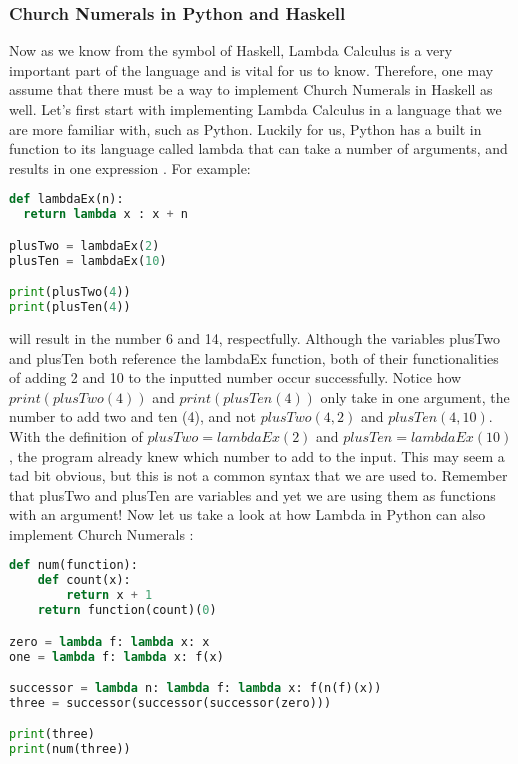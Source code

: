 \documentclass{article}
\begin{document}
\subsubsection{Church Numerals in Python and Haskell}
Now as we know from the symbol of Haskell, Lambda Calculus is a very important part of the language and is vital for us to know. Therefore, one may assume that there must be a way to implement Church Numerals in Haskell as well. Let's first start with implementing Lambda Calculus in a language that we are more familiar with, such as Python. Luckily for us, Python has a built in function to its language called lambda that can take a number of arguments, and results in one expression \cite{LCP}. For example:
\begin{lstlisting}[language=Python]
def lambdaEx(n):
  return lambda x : x + n

plusTwo = lambdaEx(2)
plusTen = lambdaEx(10)

print(plusTwo(4)) 
print(plusTen(4)) 
\end{lstlisting}

\noindent
will result in the number 6 and 14, respectfully. Although the variables plusTwo and plusTen both reference the lambdaEx function, both of their functionalities of adding 2 and 10 to the inputted number occur successfully. Notice how $print(plusTwo(4))$ and $print(plusTen(4))$ only take in one argument, the number to add two and ten (4), and not $plusTwo(4, 2)$ and $plusTen(4, 10)$. With the definition of $plusTwo = lambdaEx(2)$ and $plusTen = lambdaEx(10)$, the program already knew which number to add to the input. This may seem a tad bit obvious, but this is not a common syntax that we are used to. Remember that plusTwo and plusTen are variables and yet we are using them as functions with an argument! Now let us take a look at how Lambda in Python can also implement Church Numerals \cite{LCP}:

\begin{lstlisting}[language=Python]
def num(function):
    def count(x):
        return x + 1
    return function(count)(0)

zero = lambda f: lambda x: x
one = lambda f: lambda x: f(x)

successor = lambda n: lambda f: lambda x: f(n(f)(x))
three = successor(successor(successor(zero)))

print(three)
print(num(three))
\end{lstlisting}
\end{document}
